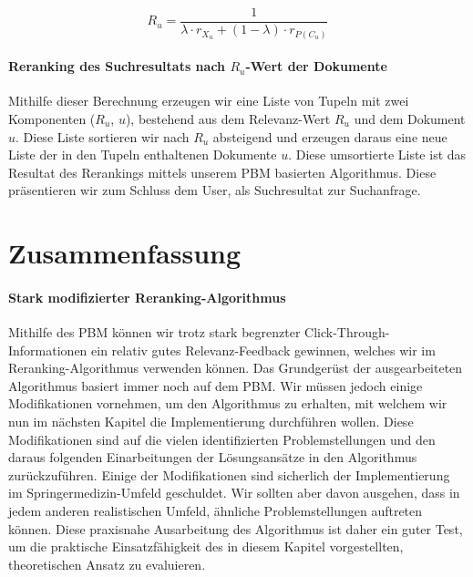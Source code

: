 \vspace{-1em}
\begin{equation}
	R_{u} = \frac{1}{\lambda\cdot r_{X_{u}} + (1 - \lambda)\cdot r_{P(C_{u})}}
\end{equation}
\vspace{-1em}

\pagebreak

\paragraph{Reranking des Suchresultats nach $R_{u}$-Wert der Dokumente}
Mithilfe dieser Berechnung erzeugen wir eine Liste von Tupeln mit zwei Komponenten ($R_{u}$, $u$), bestehend aus dem Relevanz-Wert $R_{u}$ und dem Dokument $u$. Diese Liste sortieren wir nach $R_{u}$ absteigend und erzeugen daraus eine neue Liste der in den Tupeln enthaltenen Dokumente $u$. Diese umsortierte Liste ist das Resultat des Rerankings mittels unserem PBM basierten Algorithmus. Diese präsentieren wir zum Schluss dem User, als Suchresultat zur Suchanfrage. 


\section{Zusammenfassung}
\label{sec:Reranking:Zusammenfassung}

\paragraph{Stark modifizierter Reranking-Algorithmus}
Mithilfe des PBM können wir trotz stark begrenzter Click-Through-Informationen ein relativ gutes Relevanz-Feedback gewinnen, welches wir im Reranking-Algorithmus verwenden können. Das Grundgerüst der ausgearbeiteten Algorithmus basiert immer noch auf dem PBM. Wir müssen jedoch einige Modifikationen vornehmen, um den Algorithmus zu erhalten, mit welchem wir nun im nächsten Kapitel die Implementierung durchführen wollen. Diese Modifikationen sind auf die vielen identifizierten Problemstellungen und den daraus folgenden Einarbeitungen der Lösungsansätze in den Algorithmus zurückzuführen. Einige der Modifikationen sind sicherlich der Implementierung im Springermedizin-Umfeld geschuldet. Wir sollten aber davon ausgehen, dass in jedem anderen realistischen Umfeld, ähnliche Problemstellungen auftreten können. Diese praxisnahe Ausarbeitung des Algorithmus ist daher ein guter Test, um die praktische Einsatzfähigkeit des in diesem Kapitel vorgestellten, theoretischen Ansatz zu evaluieren. 

